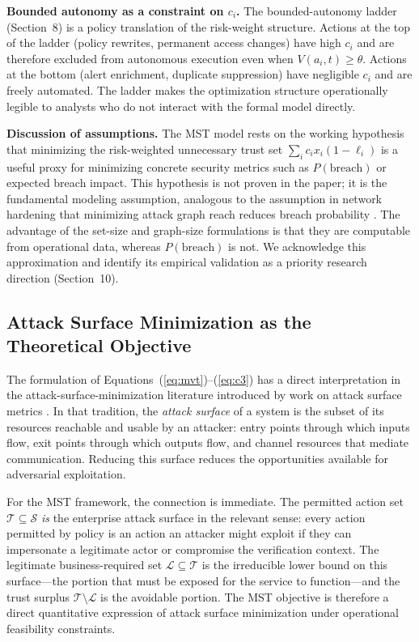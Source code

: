\documentclass[acmlarge]{acmart}
\begin{document}
\textbf{Bounded autonomy as a constraint on $c_i$.} The bounded-autonomy ladder
(Section~8) is a policy translation of the risk-weight structure. Actions at the
top of the ladder (policy rewrites, permanent access changes) have high $c_i$ and
are therefore excluded from autonomous execution even when $V(a_i, t) \geq \theta$.
Actions at the bottom (alert enrichment, duplicate suppression) have negligible
$c_i$ and are freely automated. The ladder makes the optimization structure
operationally legible to analysts who do not interact with the formal model directly.

\textbf{Discussion of assumptions.} The MST model rests on the working hypothesis
that minimizing the risk-weighted unnecessary trust set $\sum_i c_i x_i (1 - \ell_i)$
is a useful proxy for minimizing concrete security metrics such as $P(\text{breach})$
or expected breach impact. This hypothesis is not proven in the paper; it is the
fundamental modeling assumption, analogous to the assumption in network hardening
that minimizing attack graph reach reduces breach probability \cite{shandilya2014}.
The advantage of the set-size and graph-size formulations is that they are
computable from operational data, whereas $P(\text{breach})$ is not. We acknowledge
this approximation and identify its empirical validation as a priority research
direction (Section~10).



\subsection{Attack Surface Minimization as the Theoretical Objective}
\label{sec:theory_surface}

The formulation of Equations~(\ref{eq:mvt})--(\ref{eq:c3}) has a direct interpretation
in the attack-surface-minimization literature introduced by work on attack surface metrics \cite{howard2005,manadhata2011}. In that
tradition, the \textit{attack surface} of a system is the subset of its resources
reachable and usable by an attacker: entry points through which inputs flow, exit points
through which outputs flow, and channel resources that mediate communication. Reducing
this surface reduces the opportunities available for adversarial exploitation.

For the MST framework, the connection is immediate. The permitted action set
$\mathcal{T} \subseteq \mathcal{S}$ \emph{is} the enterprise attack surface in the
relevant sense: every action permitted by policy is an action an attacker might
exploit if they can impersonate a legitimate actor or compromise the verification
context. The legitimate business-required set $\mathcal{L} \subseteq \mathcal{T}$ is
the irreducible lower bound on this surface---the portion that must be exposed for
the service to function---and the trust surplus $\mathcal{T} \setminus \mathcal{L}$
is the avoidable portion. The MST objective is therefore a direct quantitative
expression of attack surface minimization under operational feasibility constraints.
\end{document}
